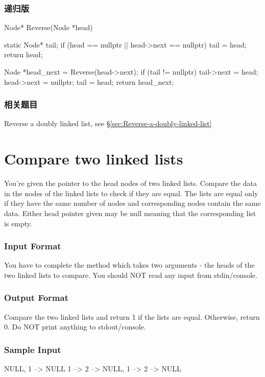 \subsubsection{递归版}
\begin{Code}
Node* Reverse(Node *head) {
    static Node* tail;
    if (head == nullptr || head->next == nullptr) {
        tail = head;
        return head;
    }

    Node *head_next = Reverse(head->next);
    if (tail != nullptr) {
        tail->next = head;
        head->next = nullptr;
    }
    tail = head;
    return head_next;
}
\end{Code}


\subsubsection{相关题目}
\begindot
\item Reverse a doubly linked list, see \S \ref{sec:Reverse-a-doubly-linked-list}
\myenddot


\section{Compare two linked lists} %
\label{sec:Compare-two-linked-lists}

You’re given the pointer to the head nodes of two linked lists. Compare the data in the nodes of the linked lists to check if they are equal. The lists are equal only if they have the same number of nodes and corresponding nodes contain the same data. Either head pointer given may be null meaning that the corresponding list is empty.


\subsubsection{Input Format}
You have to complete the  method which takes two arguments - the heads of the two linked lists to compare. You should NOT read any input from stdin/console.


\subsubsection{Output Format}
Compare the two linked lists and return 1 if the lists are equal. Otherwise, return 0. Do NOT print anything to stdout/console.


\subsubsection{Sample Input}
\begin{Code}
NULL, 1 –> NULL
1 –> 2 –> NULL, 1 –> 2 –> NULL
\end{Code}


